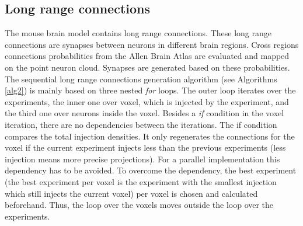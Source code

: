 \subsection{Long range connections}
The mouse brain model contains long range connections.
These long range connections are synapses between neurons in different brain regions.
Cross regions connections probabilities from the Allen Brain Atlas are evaluated and 
mapped on the point neuron cloud. Synapses are generated based on these probabilities.
The sequential long range connections generation algorithm (see Algorithms \ref{alg2}) is mainly based on three nested \emph{for} loops.
The outer loop iterates over the experiments, the inner one over voxel, which is injected by the experiment, and the third
one over neurons inside the voxel.
Besides a \emph{if} condition in the voxel iteration, there are no dependencies between the iterations.
The if condition compares the total injection densities.
It only regenerates the connections for the voxel if the current
experiment injects less than the previous experiments (less injection means more precise projections).
For a parallel implementation this dependency has to be avoided.
To overcome the dependency, the best experiment (the best experiment per voxel is the experiment with the smallest injection which still injects the current voxel) per voxel is chosen and calculated beforehand.
Thus, the loop over the voxels moves outside the loop over the experiments.

